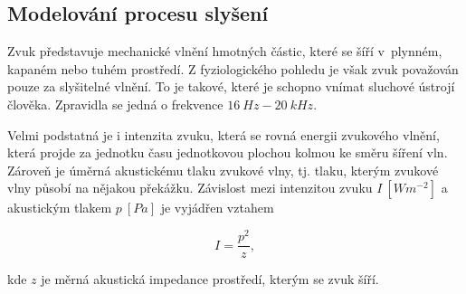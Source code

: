 

\subsection{Modelování procesu slyšení}
\label{chap:asr:parametrization:hearing}

Zvuk představuje mechanické vlnění hmotných částic, které se šíří v~plynném, kapaném nebo tuhém prostředí.
Z fyziologického pohledu je však zvuk považován pouze za slyšitelné vlnění.
To je takové, které je schopno vnímat sluchové ústrojí člověka. Zpravidla se jedná o frekvence $16\ Hz - 20\ kHz$.

Velmi podstatná je i intenzita zvuku, která se rovná energii zvukového vlnění, která projde za jednotku času jednotkovou plochou kolmou ke směru šíření vln. Zároveň je úměrná akustickému tlaku zvukové vlny, tj. tlaku, kterým zvukové vlny působí na nějakou překážku.
Závislost mezi intenzitou zvuku $I\ \left[Wm^{-2}\right]$ a akustickým tlakem $p\ \left[Pa\right]$ je vyjádřen vztahem

\begin{equation}
  I = \frac{p^{2}}{z},
  \label{eq:asr:mfcc:intesity}
\end{equation}

\noindent kde $z$ je měrná akustická impedance prostředí, kterým se zvuk šíří.

